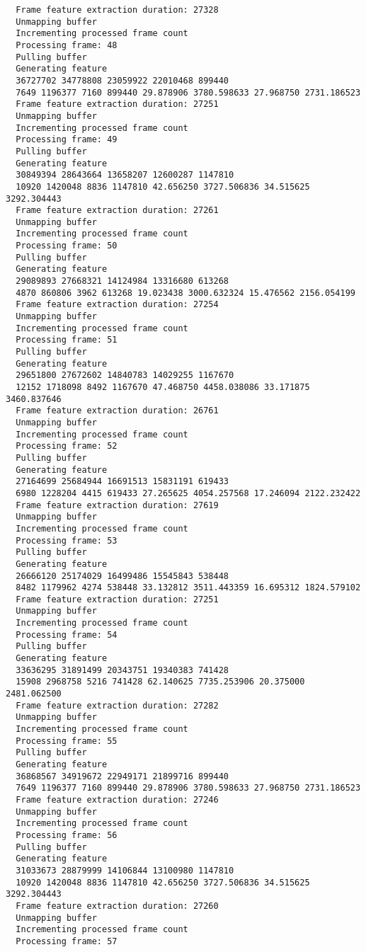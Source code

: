 \documentclass[12pt,oneside]{book}
\begin{document}
\begin{lstlisting}
  Frame feature extraction duration: 27328
  Unmapping buffer
  Incrementing processed frame count
  Processing frame: 48
  Pulling buffer
  Generating feature
  36727702 34778808 23059922 22010468 899440
  7649 1196377 7160 899440 29.878906 3780.598633 27.968750 2731.186523
  Frame feature extraction duration: 27251
  Unmapping buffer
  Incrementing processed frame count
  Processing frame: 49
  Pulling buffer
  Generating feature
  30849394 28643664 13658207 12600287 1147810
  10920 1420048 8836 1147810 42.656250 3727.506836 34.515625 3292.304443
  Frame feature extraction duration: 27261
  Unmapping buffer
  Incrementing processed frame count
  Processing frame: 50
  Pulling buffer
  Generating feature
  29089893 27668321 14124984 13316680 613268
  4870 860806 3962 613268 19.023438 3000.632324 15.476562 2156.054199
  Frame feature extraction duration: 27254
  Unmapping buffer
  Incrementing processed frame count
  Processing frame: 51
  Pulling buffer
  Generating feature
  29651800 27672602 14840783 14029255 1167670
  12152 1718098 8492 1167670 47.468750 4458.038086 33.171875 3460.837646
  Frame feature extraction duration: 26761
  Unmapping buffer
  Incrementing processed frame count
  Processing frame: 52
  Pulling buffer
  Generating feature
  27164699 25684944 16691513 15831191 619433
  6980 1228204 4415 619433 27.265625 4054.257568 17.246094 2122.232422
  Frame feature extraction duration: 27619
  Unmapping buffer
  Incrementing processed frame count
  Processing frame: 53
  Pulling buffer
  Generating feature
  26666120 25174029 16499486 15545843 538448
  8482 1179962 4274 538448 33.132812 3511.443359 16.695312 1824.579102
  Frame feature extraction duration: 27251
  Unmapping buffer
  Incrementing processed frame count
  Processing frame: 54
  Pulling buffer
  Generating feature
  33636295 31891499 20343751 19340383 741428
  15908 2968758 5216 741428 62.140625 7735.253906 20.375000 2481.062500
  Frame feature extraction duration: 27282
  Unmapping buffer
  Incrementing processed frame count
  Processing frame: 55
  Pulling buffer
  Generating feature
  36868567 34919672 22949171 21899716 899440
  7649 1196377 7160 899440 29.878906 3780.598633 27.968750 2731.186523
  Frame feature extraction duration: 27246
  Unmapping buffer
  Incrementing processed frame count
  Processing frame: 56
  Pulling buffer
  Generating feature
  31033673 28879999 14106844 13100980 1147810
  10920 1420048 8836 1147810 42.656250 3727.506836 34.515625 3292.304443
  Frame feature extraction duration: 27260
  Unmapping buffer
  Incrementing processed frame count
  Processing frame: 57

\end{lstlisting}
\end{document}
